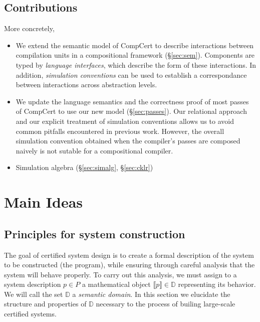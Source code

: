 \documentclass[sigplan,10pt,review,anonymous]{acmart}
\begin{document}

\subsection{Contributions} %

More concretely,
\begin{itemize}
\item
  We extend the semantic model of CompCert
  to describe interactions between compilation units
  in a compositional framework (\S\ref{sec:sem}).
  Components are typed by \emph{language interfaces},
  which describe the form of these interactions.
  In addition,
  \emph{simulation conventions}
  can be used to establish a correspondance between interactions
  across abstraction levels.
\item
  We update the language semantics and
  the correctness proof of most passes of CompCert
  to use our new model (\S\ref{sec:passes}).
  Our relational approach and
  our explicit treatment of simulation conventions
  allows us to avoid common pitfalls
  encountered in previous work.
  However,
  the overall simulation convention obtained
  when the compiler's passes are composed naively
  is not sutable for a compositional compiler.
\item
  Simulation algebra (\S\ref{sec:simalg}, \S\ref{sec:cklr})
\end{itemize}



\section{Main Ideas} \label{sec:mainideas} %

\subsection{Principles for system construction} %


The goal of certified system design is
to create a formal description of
the system to be constructed (the program),
while ensuring through careful analysis that the system
will behave properly.
To carry out this analysis,
we must assign
to a system description $p \in P$
a mathematical object $\llbracket p \rrbracket \in \mathbb{D}$
representing its behavior.
We will call the set $\mathbb{D}$ a \emph{semantic domain}.
In this section we elucidate
the structure and properties of $\mathbb{D}$
necessary to the process of builing
large-scale certified systems.
\end{document}
